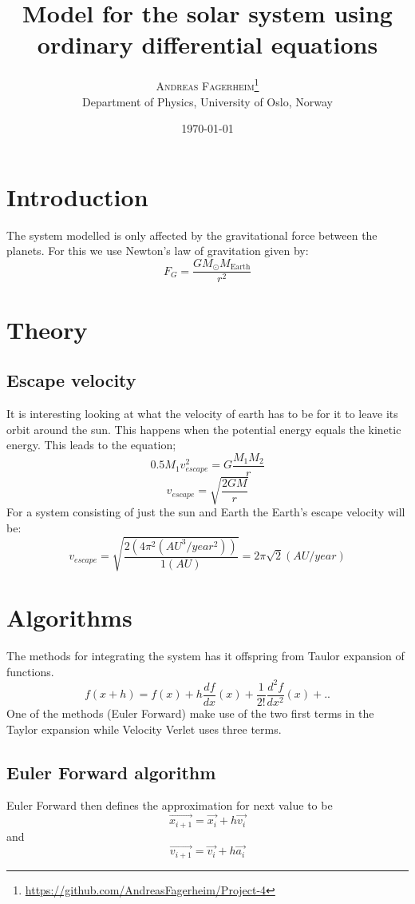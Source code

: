 \documentclass[twoside,twocolumn]{article}
\title{Model for the solar system using ordinary differential equations } %
\author{%
\textsc{Andreas Fagerheim}\thanks{\url{https://github.com/AndreasFagerheim/Project-4}} \\[1ex] %
\normalsize Department of Physics, University of Oslo, Norway \\ %
}
\date{\today} %
\begin{document}
\maketitle

\section{Introduction}

The system modelled is only affected by the gravitational force between the planets. For this we use Newton's law of gravitation given by:
\begin{equation}
F_G=\frac{GM_{\odot}M_{\mathrm{Earth}}}{r^2}
\end{equation}
\section{Theory}

\subsection{Escape velocity}
It is interesting looking at what the velocity of earth has to be for it to leave its orbit around the sun. This happens when the potential energy equals the kinetic energy. This leads to the equation;
\begin{equation}
0.5M_1v_{escape}^2 = G\frac{M_1M_2}{r}
\end{equation}
\begin{equation}
v_{escape}= \sqrt{\frac{2GM}{r}} 
\end{equation}
For a system consisting of just the sun and Earth the Earth's escape velocity will be:
\begin{equation}
v_{escape}= \sqrt{\frac{2(4\pi^2 (AU^3/year^2))}{1 (AU)}} = 2\pi \sqrt{2} (AU/year)
\end{equation}
\section{Algorithms}
The methods for integrating the system has it offspring from Taulor expansion of functions. 
\[
f(x+h) = f(x) +h\frac{df}{dx}(x)+\frac{1}{2!}\frac{d^2f}{dx^2}(x) +..
\]
One of the methods (Euler Forward) make use of the two first terms in the Taylor expansion while Velocity Verlet uses three terms. 
\subsection{Euler Forward algorithm}
Euler Forward then defines the approximation for next value to be
\begin{equation}
\vec{  x_{i+1}} = \vec{x_{i}} + h \vec{v_i}
\end{equation}
and
\begin{equation}
\vec{  v_{i+1}} = \vec{v_{i}} + h \vec{a_i}
\end{equation}
\end{document}
